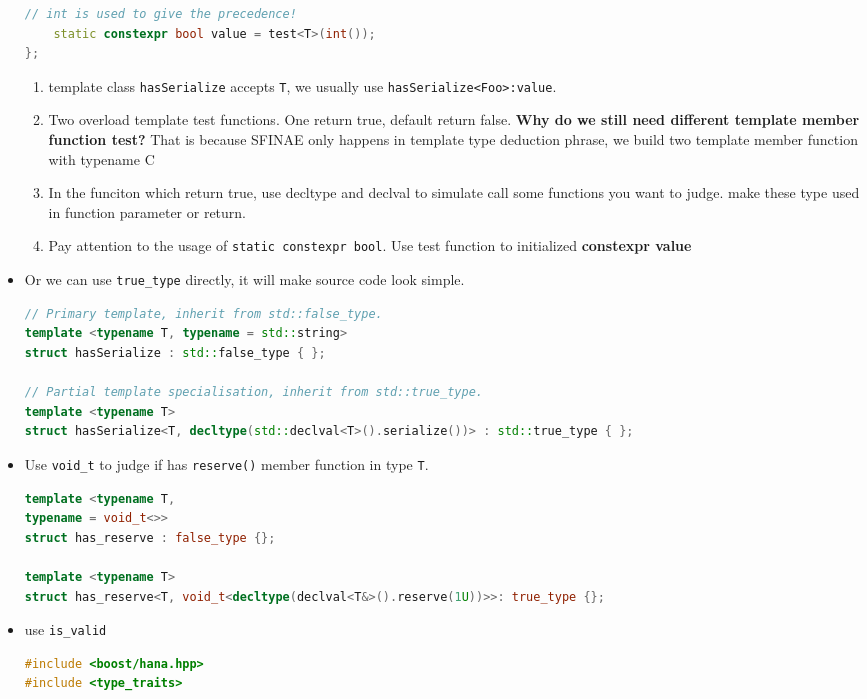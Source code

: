 \documentclass[a4paper,11pt,twoside]{book}
\begin{document}
\begin{itemize}
\begin{lstlisting}[frame=single, language=c++]
	// int is used to give the precedence!
	static constexpr bool value = test<T>(int());
};	
\end{lstlisting}
	
	\begin{enumerate}
		\item template class \texttt{hasSerialize} accepts \texttt{T}, we usually use \texttt{hasSerialize<Foo>:value}.
		
		\item Two overload template test functions. One return true, default return false. \textbf{Why do we still need different template member function test?} That is because SFINAE only happens in template type deduction phrase, we build two template member function with typename C
		
		\item In the funciton which return true, use decltype and declval to simulate call some functions you want to judge. make these type used in function parameter or return. 
		
		\item Pay attention to the usage of \texttt{static constexpr bool}. Use test function to initialized \textbf{constexpr value} 
	\end{enumerate}

	\item Or we can use \texttt{true\_type} directly, it will make source code look simple.

\begin{lstlisting}[frame=single, language=c++]
// Primary template, inherit from std::false_type.
template <typename T, typename = std::string>
struct hasSerialize : std::false_type { };

// Partial template specialisation, inherit from std::true_type.
template <typename T>
struct hasSerialize<T, decltype(std::declval<T>().serialize())> : std::true_type { };
\end{lstlisting}

	\item Use \texttt{void\_t} to judge if has \texttt{reserve()} member function in type \texttt{T}.
\begin{lstlisting}[frame=single, language=c++]
template <typename T,
typename = void_t<>>
struct has_reserve : false_type {};

template <typename T>
struct has_reserve<T, void_t<decltype(declval<T&>().reserve(1U))>>: true_type {};
\end{lstlisting}
		
	\item use \texttt{is\_valid}
\begin{lstlisting}[frame=single, language=c++]
#include <boost/hana.hpp>
#include <type_traits>


\end{lstlisting}
\end{itemize}
\end{document}
